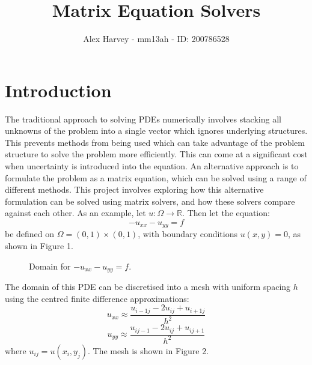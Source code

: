 \documentclass{article}
\title{Matrix Equation Solvers}
\author{Alex Harvey - mm13ah - ID: 200786528}
\date{}
\numberwithin{equation}{section}
\begin{document}
\maketitle
\section{Introduction}

The traditional approach to solving PDEs numerically involves stacking all unknowns of the problem into a single vector which ignores underlying structures. This prevents methods from being used which can take advantage of the problem structure to solve the problem more efficiently. This can come at a significant cost when uncertainty is introduced into the equation. An alternative approach is to formulate the problem as a matrix equation, which can be solved using a range of different methods. This project involves exploring how this alternative formulation can be solved using matrix solvers, and how these solvers compare against each other. As an example, let $u: \Omega \to \mathbb{R}$. Then let the equation:
	\begin{equation} 
	-u_{xx} - u_{yy} = f
	\end{equation}
be defined on $\Omega = (0,1) \times(0,1)$, with boundary conditions $u(x,y)=0$, as shown in Figure 1.

\begin{figure}[H]
\centering
\caption{Domain for $-u_{xx}-u_{yy}=f$.}
\end{figure}

The domain of this PDE can be discretised into a mesh with uniform spacing $h$ using the centred finite difference approximations:
	\begin{equation} 
	u_{xx} \approx \frac{u_{i-1j} - 2u_{ij} + u_{i+1j}}{h^2}
	\end{equation}
	\begin{equation}
	u_{yy} \approx \frac{u_{ij-1} - 2u_{ij} + u_{ij+1}}{h^2}
	\end{equation}
where $u_{ij} = u(x_i, y_j)$. The mesh is shown in Figure 2.
\end{document}
